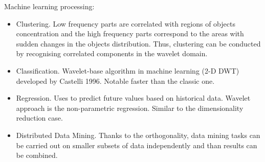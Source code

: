 Machine learning processing:
\begin{itemize}
\item Clustering. Low frequency parts are correlated with regions of objects concentration and the high frequency parts correspond to the areas with sudden changes in the objects distribution. Thus, clustering can be conducted by recognising correlated components in the wavelet domain.

\item Classification. Wavelet-base algorithm in machine learning (2-D DWT) developed by Castelli 1996. Notable faster than the classic one.

\item Regression. Uses to predict future values based on historical data. Wavelet approach is the non-parametric regression. Similar to the dimensionality reduction case.

\item Distributed Data Mining. Thanks to the orthogonality, data mining tasks can be carried out on smaller subsets of data independently and than results can be combined.
\end{itemize}


